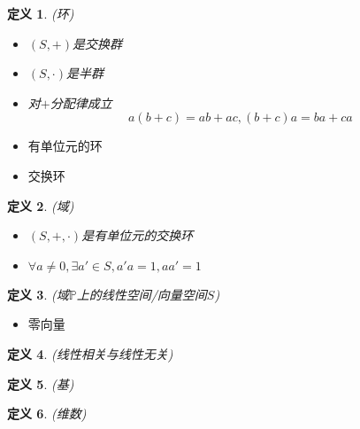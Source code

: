 \documentclass[twoside]{article}
\newtheorem{definition}{定义}[section]
\begin{document}
\begin{definition}
  (环)
  \begin{itemize}
    \item $(S, +)$是交换群
    \item $(S, \cdot)$是半群
    \item 对$+$分配律成立
      \begin{equation}
        a(b+c)=ab+ac, (b+c)a=ba+ca
      \end{equation}
  \end{itemize}
\end{definition}
\begin{itemize}
  \item 有单位元的环
  \item 交换环
\end{itemize}

\begin{definition}
  (域)
  \begin{itemize}
    \item $(S,+,\cdot)$是有单位元的交换环
    \item $\forall a\ne 0, \exists a'\in S, a'a=1, aa'=1$
  \end{itemize}
\end{definition}

\begin{definition}
  (域$\mathbb{P}$上的线性空间/向量空间$S$)
\end{definition}
\begin{itemize}
  \item 零向量
\end{itemize}

\begin{definition}
  (线性相关与线性无关)
\end{definition}

\begin{definition}
  (基)
\end{definition}

\begin{definition}
  (维数)
\end{definition}
\end{document}
